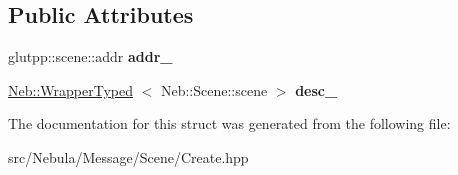 \subsection*{\-Public \-Attributes}
\begin{DoxyCompactItemize}
\item 
\hypertarget{structNeb_1_1Message_1_1Scene_1_1Create_a96b31f22acdda789448875a3c41b3cba}{glutpp\-::scene\-::addr {\bfseries addr\-\_\-}}\label{structNeb_1_1Message_1_1Scene_1_1Create_a96b31f22acdda789448875a3c41b3cba}

\item 
\hypertarget{structNeb_1_1Message_1_1Scene_1_1Create_a2859067240bab51b1afd65055713888a}{\hyperlink{classNeb_1_1WrapperTyped}{\-Neb\-::\-Wrapper\-Typed}\*
$<$ \-Neb\-::\-Scene\-::scene $>$ {\bfseries desc\-\_\-}}\label{structNeb_1_1Message_1_1Scene_1_1Create_a2859067240bab51b1afd65055713888a}

\end{DoxyCompactItemize}


\-The documentation for this struct was generated from the following file\-:\begin{DoxyCompactItemize}
\item 
src/\-Nebula/\-Message/\-Scene/\-Create.\-hpp\end{DoxyCompactItemize}
